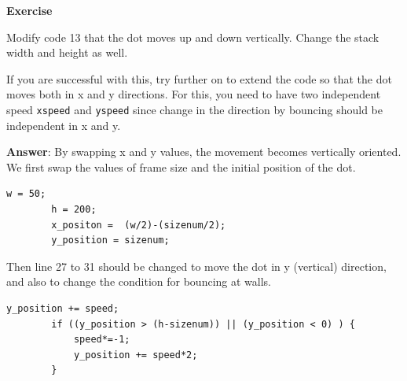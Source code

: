 \documentclass[11pt,a4paper,oneside]{report}
\newenvironment{indentexercise}[1]
{{\setlength{\leftmargin}{2em}}
\textbf{Exercise \thesubsection-#1}
\begin{list}{}
	\item
}
{\end{list}}
\newcommand{\ilcom}[1]{\texttt{\small#1}}
\begin{document}
\begin{indentexercise}{2}
Modify code 13 that the dot moves up and down vertically. Change the stack width and height as well. 

If you are successful with this, try further on to extend the code so that the dot moves both in x and y directions. For this, you need to have two independent speed \ilcom{xspeed} and \ilcom{yspeed} since change in the direction by bouncing should be independent in x and y. 

\item \textbf{Answer}: By swapping x and y values, the movement becomes vertically oriented. We first swap the values of frame size and the initial position of the dot.  
	\begin{lstlisting}[numbers=none]
		w = 50;
		h = 200;
		x_positon =  (w/2)-(sizenum/2);
		y_position = sizenum;
	\end{lstlisting}
	Then line 27 to 31 should be changed to move the dot in y (vertical) direction, and also to change the condition for bouncing at walls.
	\begin{lstlisting}[numbers=none]
		y_position += speed;
		if ((y_position > (h-sizenum)) || (y_position < 0) ) { 
			speed*=-1;
			y_position += speed*2;
		}
	\end{lstlisting}

\end{indentexercise}
\end{document}
